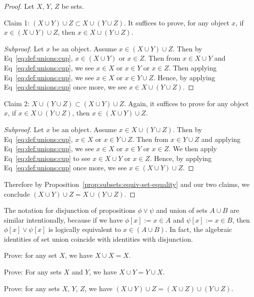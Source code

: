 \begin{proof}
Let $X$, $Y$, $Z$ be sets.

Claim 1: $(X\cup Y)\cup Z\subset X\cup(Y\cup Z)$. It suffices to prove,
for any object $x$, if $x\in (X\cup Y)\cup Z$, then $x\in X\cup(Y\cup Z)$.
\begin{proof}[Subproof]
Let $x$ be an object. Assume $x\in (X\cup Y)\cup Z$.
Then by Eq~\eqref{eq:def:unions:cup}, $x\in(X\cup Y)$ or $x\in Z$.
Then from $x\in X\cup Y$ and Eq~\eqref{eq:def:unions:cup}, we see $x\in X$
or $x\in Y$ or $x\in Z$.
Then applying Eq~\eqref{eq:def:unions:cup}, we see $x\in X$ or $x\in Y\cup Z$.
Hence, by applying Eq~\eqref{eq:def:unions:cup} once more, we see $x\in X\cup(Y\cup Z)$.
\end{proof}

Claim 2: $X\cup(Y\cup Z)\subset(X\cup Y)\cup Z$. Again, it suffices to
prove for any object $x$, if $x\in X\cup(Y\cup Z)$, then $x\in (X\cup Y)\cup Z$.
\begin{proof}[Subproof]
Let $x$ be an object. Assume $x\in X\cup(Y\cup Z)$.
Then by Eq~\eqref{eq:def:unions:cup}, $x\in X$ or $x\in Y\cup Z$.
Then from $x\in Y\cup Z$ and applying Eq~\eqref{eq:def:unions:cup}, we
see $x\in X$ or $x\in Y$ or $x\in Z$.
We then apply Eq~\eqref{eq:def:unions:cup} to see $x\in X\cup Y$ or
$x\in Z$.
Hence, by applying Eq~\eqref{eq:def:unions:cup} once more, we see
$x\in(X\cup Y)\cup Z$.
\end{proof}

Therefore by Proposition~\ref{prop:subsets:equiv-set-equality} and our
two claims, we conclude $(X\cup Y)\cup Z=X\cup(Y\cup Z)$.
\end{proof}

The notation for disjunction of propositions $\phi\lor\psi$ and union
of sets $A\cup B$ are similar intentionally, because if we have
$\phi[x]:=x\in A$ and $\psi[x]:=x\in B$, then $\phi[x]\lor\psi[x]$ is
logically equivalent to $x\in(A\cup B)$. In fact, the algebraic
identities of set union coincide with identities with disjunction.


\begin{xca}
Prove: for any set $X$, we have $X\cup X=X$.
\end{xca}

\begin{xca}
Prove: For any sets $X$ and $Y$, we have $X\cup Y=Y\cup X$.
\end{xca}

\begin{xca}
Prove: for any sets $X$, $Y$, $Z$, we have $(X\cup Y)\cup Z=(X\cup Z)\cup(Y\cup Z)$.
\end{xca}


